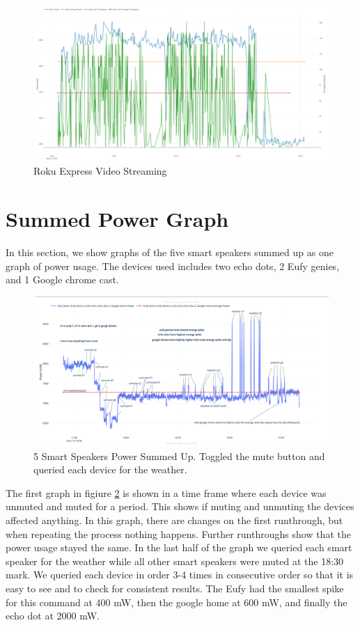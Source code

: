 \begin{figure}[H]
  \centering
  \includegraphics[width=1\textwidth]{figures/rokuStreaming.png}
  \caption{Roku Express Video Streaming}
  \label{fig:rokuStreaming}
\end{figure}

\section{Summed Power Graph}
\label{sumPowerGraph}
In this section, we show graphs of the five smart speakers summed up as one graph of power usage. The devices used includes two echo dots, 2 Eufy genies, and 1 Google chrome cast.

\begin{figure}[H]
  \centering
  \includegraphics[width=1\textwidth]{figures/weatherSum.png}
  \caption{5 Smart Speakers Power Summed Up. Toggled the mute button and queried each device for the weather.}
  \label{fig:weatherSum}
\end{figure}

The first graph in figiure \ref{fig:weatherSum} is shown in a time frame where each device was unmuted and muted for a period. This shows if muting and unmuting the devices affected anything. In this graph, there are changes on the first runthrough, but when repeating the process nothing happens. Further runthroughs show that the power usage stayed the same. In the last half of the graph we queried each smart speaker for the weather while all other smart speakers were muted at the 18:30 mark. We queried each device in order 3-4 times in consecutive order so that it is easy to see and to check for consistent results. The Eufy had the smallest spike for this command at 400 mW, then the google home at 600 mW, and finally the echo dot at 2000 mW.

